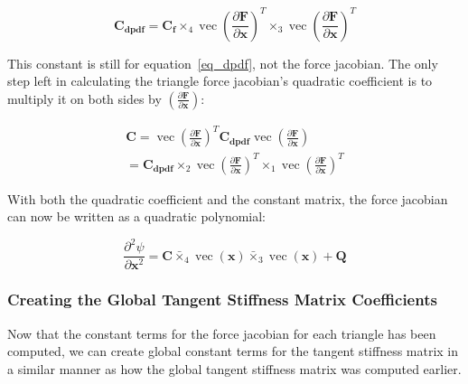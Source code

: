 \documentclass[twocolumn,10pt]{asme2ej}
\DeclareMathOperator{\vect}{vec}
\begin{document}
\begin{equation}
\bm{C_{dpdf}}  = \bm{C_f} \times_4 \vect \left( \frac{\partial \bm{F}}{\partial \bm{x}} \right)^T \times_3 \vect \left( \frac{\partial \bm{F}}{\partial \bm{x}}\right)^T
\end{equation}

This constant is still for equation~\ref{eq_dpdf}, not the force jacobian. The only step left in calculating the triangle force jacobian's quadratic coefficient is to multiply it on both sides by $\left(\frac{\partial \bm{F}}{\partial \bm{x}}\right)$:

\begin{multline}
\bm{C}  = \vect \left( \frac{\partial \bm{F}}{\partial \bm{x}} \right)^T \bm{C_{dpdf}} \vect \left( \frac{\partial \bm{F}}{\partial \bm{x}} \right)
\\ = \bm{C_{dpdf}} \times_2 \vect \left( \frac{\partial \bm{F}}{\partial \bm{x}} \right)^T \times_1 \vect \left( \frac{\partial \bm{F}}{\partial \bm{x}}\right)^T
\end{multline}

With both the quadratic coefficient and the constant matrix, the force jacobian can now be written as a quadratic polynomial:

\begin{equation}
\frac{\partial^2 \psi}{\partial \bm{x}^2} = \bm{C} \bar{\times}_4 \vect (\bm{x}) \bar{\times}_3 \vect (\bm{x}) + \bm{Q}
\label{eq_unreducedQuadratic}
\end{equation}

\subsubsection{Creating the Global Tangent Stiffness Matrix Coefficients}

Now that the constant terms for the force jacobian for each triangle has been computed, we can create global constant terms for the tangent stiffness matrix in a similar manner as how the global tangent stiffness matrix was computed earlier.
\end{document}
